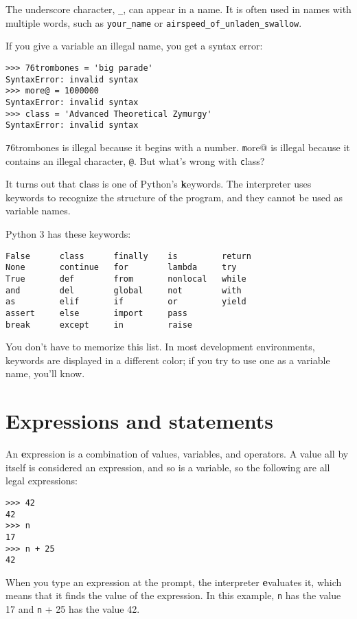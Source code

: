 \documentclass[
DIV=11,
fontsize=13,
twoside,
headinclude=false,
titlepage=firstiscover,
abstract=true,
headsepline=true,
footsepline=true,
chapterprefix=true, %
headings=big,
bibliography=totoc,%
captions=tableheading
]{scrbook}
\theoremstyle{definition}
\begin{document}
The underscore character, \verb"_", can appear in a name.
It is often used in names with multiple words, such as
\verb"your_name" or \verb"airspeed_of_unladen_swallow".

If you give a variable an illegal name, you get a syntax error:

\begin{lstlisting}
>>> 76trombones = 'big parade'
SyntaxError: invalid syntax
>>> more@ = 1000000
SyntaxError: invalid syntax
>>> class = 'Advanced Theoretical Zymurgy'
SyntaxError: invalid syntax
\end{lstlisting}
%
{\texttt 76trombones} is illegal because it begins with a number.
{\texttt more@} is illegal because it contains an illegal character, {\texttt
@}.  But what's wrong with {\texttt class}?

It turns out that {\texttt class} is one of Python's {\textbf keywords}.  The
interpreter uses keywords to recognize the structure of the program,
and they cannot be used as variable names.

Python 3 has these keywords:

\begin{lstlisting}
False      class      finally    is         return
None       continue   for        lambda     try
True       def        from       nonlocal   while
and        del        global     not        with
as         elif       if         or         yield
assert     else       import     pass
break      except     in         raise
\end{lstlisting}
%
You don't have to memorize this list.  In most development environments,
keywords are displayed in a different color; if you try to use one
as a variable name, you'll know.


\section{Expressions and statements}

An {\textbf expression} is a combination of values, variables, and operators.
A value all by itself is considered an expression, and so is
a variable, so the following are all legal expressions:

\begin{lstlisting}
>>> 42
42
>>> n
17
>>> n + 25
42
\end{lstlisting}
%
When you type an expression at the prompt, the interpreter
{\textbf evaluates} it, which means that it finds the value of
the expression.
In this example, {\texttt n} has the value 17 and
{\texttt n + 25} has the value 42.
\end{document}
